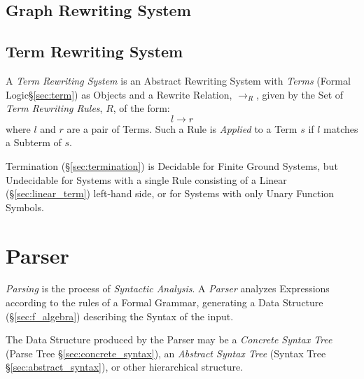 \subsection{Graph Rewriting System}\label{sec:graph_rewriting}

\subsection{Term Rewriting System}\label{sec:term_rewriting}

A \emph{Term Rewriting System} is an Abstract Rewriting System with
\emph{Terms} (Formal Logic\S\ref{sec:term}) as Objects and a Rewrite
Relation, $\rightarrow_R$, given by the Set of \emph{Term Rewriting
  Rules}, $R$, of the form:
\[
  l \rightarrow r
\]
where $l$ and $r$ are a pair of Terms. Such a Rule is \emph{Applied}
to a Term $s$ if $l$ matches a Subterm of $s$.

Termination (\S\ref{sec:termination}) is Decidable for Finite Ground
Systems, but Undecidable for Systems with a single Rule consisting of
a Linear (\S\ref{sec:linear_term}) left-hand side, or for Systems with
only Unary Function Symbols. %



\section{Parser} \label{sec:parser}

\emph{Parsing} is the process of \emph{Syntactic Analysis}. A
\emph{Parser} analyzes Expressions according to the rules of a Formal
Grammar, generating a Data Structure (\S\ref{sec:f_algebra})
describing the Syntax of the input.

The Data Structure produced by the Parser may be a \emph{Concrete
  Syntax Tree} (Parse Tree \S\ref{sec:concrete_syntax}), an
\emph{Abstract Syntax Tree} (Syntax Tree \S\ref{sec:abstract_syntax}),
or other hierarchical structure.



